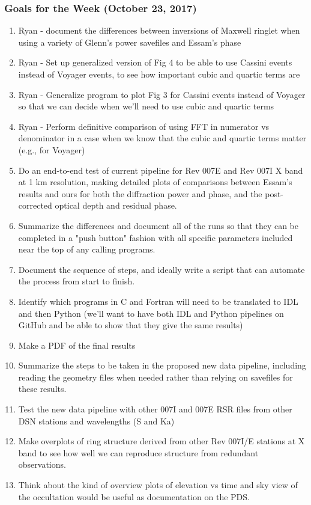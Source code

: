 \documentclass[crop=false,class=book]{standalone}
\begin{document}
\subsubsection{\footnotesize Goals for the Week (October 23, 2017)}
\begin{enumerate}
    \item Ryan - document the differences between inversions of Maxwell ringlet when using a variety of Glenn's power savefiles and Essam's phase
    \item Ryan - Set up generalized version of Fig 4 to be able to use Cassini events instead of Voyager events, to see how important cubic and quartic terms are
    \item Ryan - Generalize program to plot Fig 3 for Cassini events instead of Voyager so that we can decide when we'll need to use cubic and quartic terms
    \item Ryan - Perform definitive comparison of using FFT in numerator vs denominator in a case when we know that the cubic and quartic terms matter (e.g., for Voyager)
    \item Do an end-to-end test of current pipeline for Rev 007E and Rev 007I X band at 1 km resolution, making detailed plots of comparisons between Essam's results and ours for both the diffraction power and phase, and the post-corrected optical depth and residual phase. 
    \item Summarize the differences and document all of the runs so that they can be completed in a "push button" fashion with all specific parameters included near the top of any calling programs. 
    \item Document the sequence of steps, and ideally write a script that can automate the process from start to finish. 
    \item Identify which programs in C and Fortran will need to be translated to IDL and then Python (we'll want to have both IDL and Python pipelines on GitHub and be able to show that they give the same results)
    \item Make a PDF of the final results
    \item Summarize the steps to be taken in the proposed new data pipeline, including reading the geometry files when needed rather than relying on savefiles for these results.
    \item Test the new data pipeline with other 007I and 007E RSR files from other DSN stations and wavelengths (S and Ka)
    \item Make overplots of ring structure derived from other Rev 007I/E stations at X band to see how well we can reproduce structure from redundant observations.
    \item Think about the kind of overview plots of elevation vs time and sky view of the occultation would be useful as documentation on the PDS.
\end{enumerate}
\end{document}
